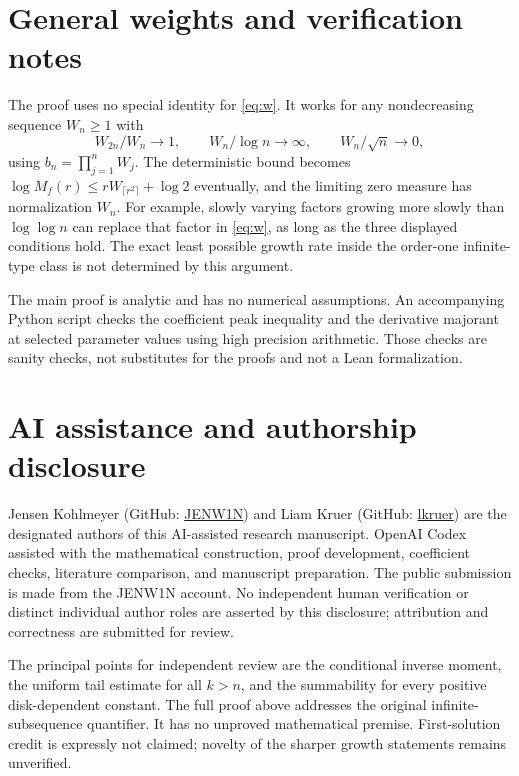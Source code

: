 \documentclass[11pt]{article}
\theoremstyle{remark}
\begin{document}
\section{General weights and verification notes}

The proof uses no special identity for \eqref{eq:w}. It works for any
nondecreasing sequence $W_n\geq1$ with
\[
 W_{2n}/W_n\to1,\qquad W_n/\log n\to\infty,\qquad
 W_n/\sqrt n\to0,
\]
using $b_n=\prod_{j=1}^nW_j$. The deterministic bound becomes
$\log M_f(r)\leq rW_{\lceil r^2\rceil}+\log2$ eventually,
and the limiting zero measure has normalization $W_n$.
For example, slowly varying factors growing more slowly than
$\log\log n$ can replace that factor in \eqref{eq:w}, as long as
the three displayed conditions hold. The exact least possible
growth rate inside the order-one infinite-type class is not determined
by this argument.

The main proof is analytic and has no numerical assumptions. An
accompanying Python script checks the coefficient peak inequality and
the derivative majorant at selected parameter values using high
precision arithmetic. Those checks are sanity checks, not substitutes
for the proofs and not a Lean formalization.

\section*{AI assistance and authorship disclosure}

Jensen Kohlmeyer (GitHub: \href{https://github.com/JENW1N}{JENW1N})
and Liam Kruer (GitHub: \href{https://github.com/lkruer}{lkruer})
are the designated authors of this AI-assisted research manuscript.
OpenAI Codex assisted with the mathematical construction, proof development,
coefficient checks, literature comparison, and manuscript preparation.
The public submission is made from the JENW1N account.
No independent human verification or distinct individual author roles
are asserted by this disclosure; attribution and correctness are
submitted for review.

The principal points for independent review are the conditional inverse
moment, the uniform tail estimate for all $k>n$, and the summability
for every positive disk-dependent constant. The full proof above
addresses the original infinite-subsequence quantifier. It has no
unproved mathematical premise. First-solution credit is expressly not
claimed; novelty of the sharper growth statements remains unverified.
\end{document}
